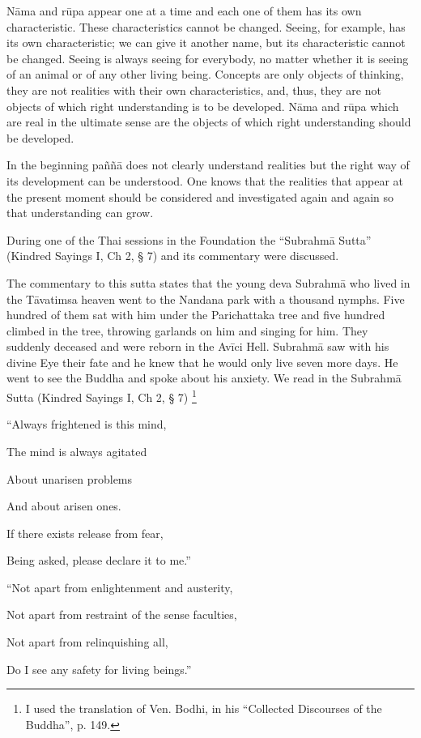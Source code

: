 {{{{{{{Nāma and rūpa appear one at a time and
each one of them has its own characteristic. These characteristics
cannot be changed. Seeing, for example, has its own characteristic; we
can give it another name, but its characteristic cannot be changed.
Seeing is always seeing for everybody, no matter whether it is seeing of
an animal or of any other living being. Concepts are only objects of
thinking, they are not realities with their own characteristics, and,
thus, they are not objects of which right understanding is to be
developed. Nāma and rūpa which are real in the ultimate sense are the
objects of which right understanding should be developed.

In the beginning paññā does not clearly
understand realities but the right way of its development can be
understood. One knows that the realities that appear at the present
moment should be considered and investigated again and again so that
understanding can grow. ~

During one of the Thai sessions in the
Foundation the ``Subrahmā Sutta'' (Kindred Sayings I, Ch 2, § 7) and its
commentary were discussed. 

The commentary to this sutta states
that the young deva Subrahmā who lived in the Tāvatimsa heaven went to
the Nandana park with a thousand nymphs. Five hundred of them sat with
him under the Parichattaka tree and five hundred climbed in the tree,
throwing garlands on him and singing for him. They suddenly deceased and
were reborn in the Avīci Hell. Subrahmā saw with his divine Eye their
fate and he knew that he would only live seven more days. He went to see
the Buddha and spoke about his anxiety. We read in the Subrahmā Sutta
(Kindred Sayings I, Ch 2, § 7)
\footnote{I used the translation of Ven.
Bodhi, in his ``Collected Discourses of the Buddha'', p. 149.}


``Always frightened is this mind,

The mind is always agitated

About unarisen problems

And about arisen ones.

If there exists release from fear,

Being asked, please declare it to me.''

``Not apart from enlightenment and
austerity,

Not apart from restraint of the sense faculties,

Not apart from relinquishing all,

Do I see any safety for living beings.''

}}}}}}}
